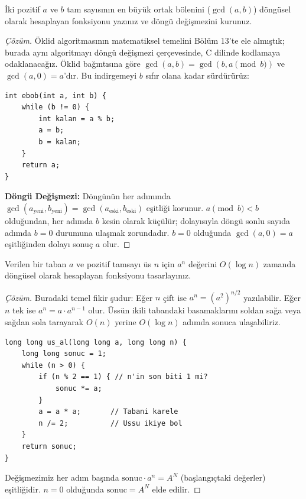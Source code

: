 \begin{example}
İki pozitif $a$ ve $b$ tam sayısının en büyük ortak bölenini ($\gcd(a, b)$) döngüsel olarak hesaplayan fonksiyonu yazınız ve döngü değişmezini kurunuz.
\end{example}

\begin{proof}[Çözüm]
Öklid algoritmasının matematiksel temelini Bölüm 13'te ele almıştık; burada aynı algoritmayı döngü değişmezi çerçevesinde, C dilinde kodlamaya odaklanacağız. Öklid bağıntısına göre $\gcd(a, b) = \gcd(b, a \pmod b)$ ve $\gcd(a, 0) = a$'dır. Bu indirgemeyi $b$ sıfır olana kadar sürdürürüz:

\begin{lstlisting}[language=CTemel]
int ebob(int a, int b) {
    while (b != 0) {
        int kalan = a % b;
        a = b;
        b = kalan;
    }
    return a;
}
\end{lstlisting}

\textbf{Döngü Değişmezi:} Döngünün her adımında $\gcd(a_{\text{yeni}}, b_{\text{yeni}}) = \gcd(a_{\text{eski}}, b_{\text{eski}})$ eşitliği korunur. $a \pmod b < b$ olduğundan, her adımda $b$ kesin olarak küçülür; dolayısıyla döngü sonlu sayıda adımda $b = 0$ durumuna ulaşmak zorundadır. $b = 0$ olduğunda $\gcd(a, 0) = a$ eşitliğinden dolayı sonuç $a$ olur.
\end{proof}

\begin{example}
Verilen bir taban $a$ ve pozitif tamsayı üs $n$ için $a^n$ değerini $O(\log n)$ zamanda döngüsel olarak hesaplayan fonksiyonu tasarlayınız.
\end{example}

\begin{proof}[Çözüm]
Buradaki temel fikir şudur: Eğer $n$ çift ise $a^n = (a^2)^{n/2}$ yazılabilir. Eğer $n$ tek ise $a^n = a \cdot a^{n-1}$ olur. Üssün ikili tabandaki basamaklarını soldan sağa veya sağdan sola tarayarak $O(n)$ yerine $O(\log n)$ adımda sonuca ulaşabiliriz.

\begin{lstlisting}[language=CTemel]
long long us_al(long long a, long long n) {
    long long sonuc = 1;
    while (n > 0) {
        if (n % 2 == 1) { // n'in son biti 1 mi?
            sonuc *= a;
        }
        a = a * a;       // Tabani karele
        n /= 2;          // Ussu ikiye bol
    }
    return sonuc;
}
\end{lstlisting}

Değişmezimiz her adım başında $\text{sonuc} \cdot a^n = A^N$ (başlangıçtaki değerler) eşitliğidir. $n = 0$ olduğunda $\text{sonuc} = A^N$ elde edilir.
\end{proof}

